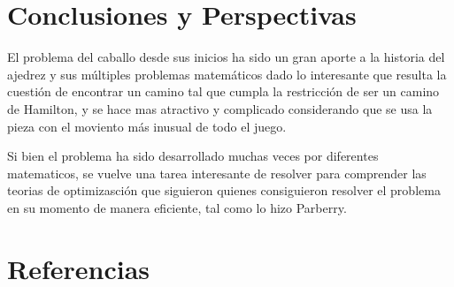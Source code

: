 \documentclass[journal, 10pt]{IEEEtran}
\begin{document}
 




\section{Conclusiones y Perspectivas}
El problema del caballo desde sus inicios ha sido un gran aporte a la historia del ajedrez y sus m\'ultiples problemas matem\'aticos dado lo interesante que resulta la cuesti\'on de encontrar un camino tal que cumpla la restricci\'on de ser un camino de Hamilton, y se hace mas atractivo y complicado considerando que se usa la pieza con el moviento m\'as inusual de todo el juego. 

Si bien el problema ha sido desarrollado muchas veces por diferentes matematicos, se vuelve una tarea interesante de resolver para comprender las teorias de optimizasci\'on que siguieron quienes consiguieron resolver el problema en su momento de manera eficiente, tal como lo hizo Parberry.








\section{Referencias}


\end{document}
